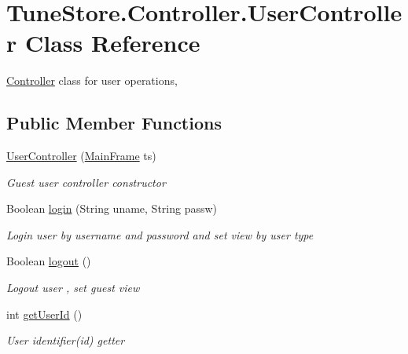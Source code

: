 \hypertarget{class_tune_store_1_1_controller_1_1_user_controller}{\section{Tune\+Store.\+Controller.\+User\+Controller Class Reference}
\label{class_tune_store_1_1_controller_1_1_user_controller}
}


\hyperlink{namespace_tune_store_1_1_controller}{Controller} class for user operations,  


\subsection*{Public Member Functions}
\begin{DoxyCompactItemize}
\item 
\hyperlink{class_tune_store_1_1_controller_1_1_user_controller_aedacc5c50043fe95376b9fbe548f1179}{User\+Controller} (\hyperlink{class_tune_store_1_1_main_frame}{Main\+Frame} ts)
\begin{DoxyCompactList}\small\item\em Guest user controller constructor \end{DoxyCompactList}\item 
Boolean \hyperlink{class_tune_store_1_1_controller_1_1_user_controller_aef029b55fd2db0e17720b06655bc34a1}{login} (String uname, String passw)
\begin{DoxyCompactList}\small\item\em Login user by username and password and set view by user type \end{DoxyCompactList}\item 
Boolean \hyperlink{class_tune_store_1_1_controller_1_1_user_controller_afa03d496d2db85b6da0017e9bb7a3b17}{logout} ()
\begin{DoxyCompactList}\small\item\em Logout user , set guest view \end{DoxyCompactList}\item 
int \hyperlink{class_tune_store_1_1_controller_1_1_user_controller_a6d842efdc09869eb99b577ed301e2bb2}{get\+User\+Id} ()
\begin{DoxyCompactList}\small\item\em User identifier(id) getter \end{DoxyCompactList}\end{DoxyCompactItemize}


